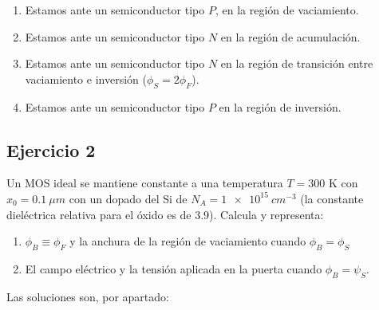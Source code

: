 \begin{enumerate}[label=\alph*)]
	\item Estamos ante un semiconductor tipo $P$, en la región de vaciamiento. 
	\item Estamos ante un semiconductor tipo $N$ en la región de acumulación. 
	\item Estamos ante un semiconductor tipo $N$ en la región de transición entre vaciamiento e inversión ($\phi_S=2\phi_F$).
	\item Estamos ante un semiconductor tipo $P$ en la región de inversión. 
\end{enumerate}

\vspace*{2em}


\begin{Enunciado}
	\subsection*{Ejercicio 2}
	Un MOS ideal se mantiene constante a una temperatura $T=300$ K con $x_0=\SI{0.1}{\mu m}$ con un dopado del Si de $N_A=\SI{1e15}{cm^{-3}}$ (la constante dieléctrica relativa para el óxido es de 3.9). Calcula y representa: 
	\begin{enumerate}[label=\alph*)]
		\item $\phi_B \equiv \phi_F$ y la anchura de la región de vaciamiento cuando $\phi_B = \phi_S$ 
		\item El campo eléctrico y la tensión aplicada en la puerta cuando $\phi_B = \psi_S$. 
	\end{enumerate}    
\end{Enunciado}

\vspace*{1em}

Las soluciones son, por apartado: 

